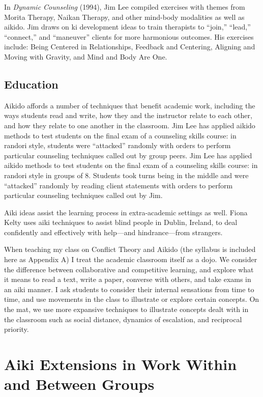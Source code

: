 In \emph{Dynamic Counseling} (1994), Jim Lee compiled exercises with themes from Morita Therapy, Naikan Therapy, and other mind-body modalities as well as aikido. Jim draws on ki development ideas to train therapists to ``join,'' ``lead,'' ``connect,'' and ``maneuver'' clients for more harmonious outcomes. His exercises include: Being Centered in Relationships, Feedback and Centering, Aligning and Moving with Gravity, and Mind and Body Are One. 

\subsection*{Education}

Aikido affords a number of techniques that benefit academic work, including the ways students read and write, how they and the instructor relate to each other, and how they relate to one another in the classroom. Jim Lee has applied aikido methods to test students on the final exam of a counseling skills course: in randori style, students were ``attacked'' randomly with orders to perform particular counseling techniques called out by group peers. Jim Lee has applied aikido methods to test students on the final exam of a counseling skills course: in randori style in groups of 8. Students took turns being in the middle and were ``attacked'' randomly by reading client statements with orders to perform particular counseling techniques called out by Jim.

Aiki ideas assist the learning process in extra-academic settings as well. Fiona Kelty uses aiki techniques to assist blind people in Dublin, Ireland, to deal confidently and effectively with help---and hindrance---from strangers. 

When teaching my class on Conflict Theory and Aikido (the syllabus is included here as Appendix A) I treat the academic classroom itself as a dojo. We consider the difference between collaborative and competitive learning, and explore what it means to read a text, write a paper, converse with others, and take exams in an aiki manner. I ask students to consider their internal sensations from time to time, and use movements in the class to illustrate or explore certain concepts. On the mat, we use more expansive techniques to illustrate concepts dealt with in the classroom such as social distance, dynamics of escalation, and reciprocal priority.

\section*{Aiki Extensions in Work Within and Between Groups}

